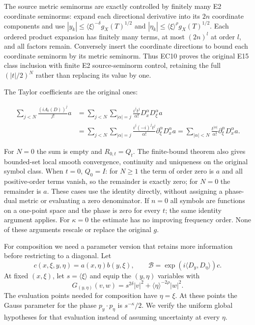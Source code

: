 \documentclass[
  11pt,
]{article}
\begin{document}
The source metric seminorms are exactly controlled by finitely many E2
coordinate seminorms: expand each directional derivative into its \(2n\)
coordinate components and use
\(|y_k|\leq\langle\xi\rangle^{-\delta}g_X(T)^{1/2}\) and
\(|\eta_k|\leq\langle\xi\rangle^\rho g_X(T)^{1/2}\). Each ordered
product expansion has finitely many terms, at most \((2n)^l\) at order
\(l\), and all factors remain. Conversely insert the coordinate
directions to bound each coordinate seminorm by its metric seminorm.
Thus EC10 proves the original E15 class inclusion with finite E2
source-seminorm control, retaining the full \((|t|/2)^N\) rather than
replacing its value by one.

The Taylor coefficients are the original ones:

\[
 \begin{split}
 \sum_{j<N}\frac{(iA_t(D))^j}{j!}a
 &=\sum_{j<N}\sum_{|\alpha|=j}
       \frac{i^j t^j}{\alpha!}D_x^\alpha D_\xi^\alpha a\\
 &=\sum_{j<N}\sum_{|\alpha|=j}
       \frac{i^j(-i)^jt^j}{\alpha!}
       \partial_\xi^\alpha D_x^\alpha a
 =\sum_{|\alpha|<N}\frac{t^{|\alpha|}}{\alpha!}
       \partial_\xi^\alpha D_x^\alpha a .
 \end{split}
 \tag{EC11}
\]

For \(N=0\) the sum is empty and \(R_{0,t}=Q_t\). The finite-bound
theorem also gives bounded-set local smooth convergence, continuity and
uniqueness on the original symbol class. When \(t=0\), \(Q_0=I\): for
\(N\geq1\) the term of order zero is \(a\) and all positive-order terms
vanish, so the remainder is exactly zero; for \(N=0\) the remainder is
\(a\). These cases use the identity directly, without assigning a
phase-dual metric or evaluating a zero denominator. If \(n=0\) all
symbols are functions on a one-point space and the phase is zero for
every \(t\); the same identity argument applies. For \(\kappa=0\) the
estimate has no improving frequency order. None of these arguments
rescale or replace the original \(g\).

For composition we need a parameter version that retains more
information before restricting to a diagonal. Let \[
c(x,\xi,y,\eta)=a(x,\eta)b(y,\xi),\qquad
\mathcal B=\exp(i\langle D_y,D_\eta\rangle)c.
\tag{E16}
\] At fixed \((x,\xi)\), let \(s=\langle\xi\rangle\) and equip the
\((y,\eta)\) variables with \[
G_{(y,\eta)}(v,w)=s^{2\delta}|v|^2+
\langle\eta\rangle^{-2\rho}|w|^2.
\tag{E17}
\] The evaluation points needed for composition have \(\eta=\xi\). At
these points the Gauss parameter for the phase \(p_y\cdot p_\eta\) is
\(s^{-\kappa}/2\). We verify the uniform global hypotheses for that
evaluation instead of assuming uncertainty at every \(\eta\).
\end{document}
